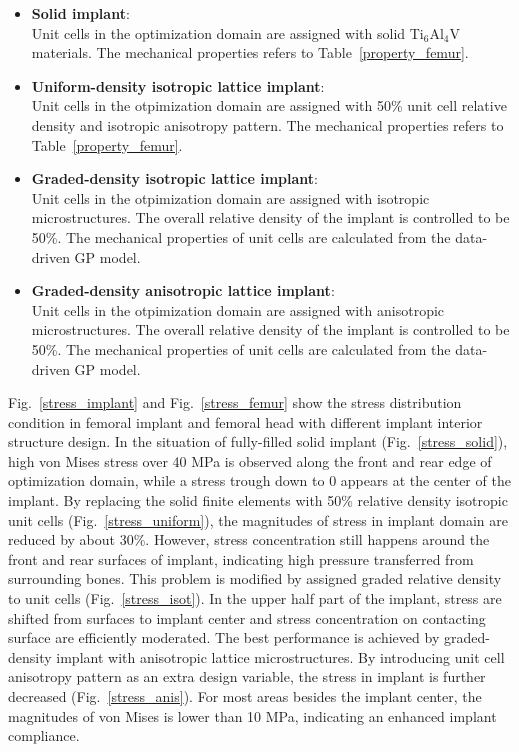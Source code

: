 \documentclass[12pt]{extbook}
\begin{document}
\begin{itemize}
\item {\bf Solid implant}:\\
Unit cells in the optimization domain are assigned with solid Ti$_6$Al$_4$V materials. The mechanical properties refers to Table~\ref{property_femur}.
\item {\bf Uniform-density isotropic lattice implant}:\\
Unit cells in the otpimization domain are assigned with 50\% unit cell relative density and isotropic anisotropy pattern. The mechanical properties refers to Table~\ref{property_femur}. 
\item {\bf Graded-density isotropic lattice implant}:\\
Unit cells in the otpimization domain are assigned with isotropic microstructures. The overall relative density of the implant is controlled to be 50\%. The mechanical properties of unit cells are calculated from the data-driven GP model.
\item {\bf Graded-density anisotropic lattice implant}:\\
Unit cells in the otpimization domain are assigned with anisotropic microstructures. The overall relative density of the implant is controlled to be 50\%. The mechanical properties of unit cells are calculated from the data-driven GP model.\\
\end{itemize}

Fig.~\ref{stress_implant} and Fig.~\ref{stress_femur} show the stress distribution condition in femoral implant and femoral head with different implant interior structure design. In the situation of fully-filled solid implant (Fig.~\ref{stress_solid}), high von Mises stress over 40 MPa is observed along the front and rear edge of optimization domain, while a stress trough down to 0 appears at the center of the implant. By replacing the solid finite elements with 50\% relative density isotropic unit cells (Fig.~\ref{stress_uniform}), the magnitudes of stress in implant domain are reduced by about 30\%. However, stress concentration still happens around the front and rear surfaces of implant, indicating high pressure transferred from surrounding bones. This problem is modified by assigned graded relative density to unit cells (Fig.~\ref{stress_isot}). In the upper half part of the implant, stress are shifted from surfaces to implant center and stress concentration on contacting surface are efficiently moderated. The best performance is achieved by graded-density implant with anisotropic lattice microstructures. By introducing unit cell anisotropy pattern as an extra design variable, the stress in implant is further decreased (Fig.~\ref{stress_anis}). For most areas besides the implant center, the magnitudes of von Mises is lower than 10 MPa, indicating an enhanced implant compliance.\\
\end{document}
